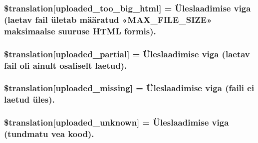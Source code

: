 \subsubsection[{\$translation}]{\setlength{\rightskip}{0pt plus 5cm}\$translation\mbox{[}\textquotesingle{}uploaded\+\_\+too\+\_\+big\+\_\+html\textquotesingle{}\mbox{]} = \textquotesingle{}Üleslaadimise viga (laetav fail ületab määratud «\+M\+A\+X\+\_\+\+F\+I\+L\+E\+\_\+\+S\+I\+Z\+E» maksimaalse suuruse H\+T\+M\+L formis).\textquotesingle{}}\label{class_8upload_8et___e_e_8php_a623d5b8b92169f57d7e43458aa911cbb}
\hypertarget{class_8upload_8et___e_e_8php_a967c17da21b0a2d3bd65cca3a9ca0ea8}{}
\subsubsection[{\$translation}]{\setlength{\rightskip}{0pt plus 5cm}\$translation\mbox{[}\textquotesingle{}uploaded\+\_\+partial\textquotesingle{}\mbox{]} = \textquotesingle{}Üleslaadimise viga (laetav fail oli ainult osaliselt laetud).\textquotesingle{}}\label{class_8upload_8et___e_e_8php_a967c17da21b0a2d3bd65cca3a9ca0ea8}
\hypertarget{class_8upload_8et___e_e_8php_a0cce433260be65f1f35853a6b4b8952b}{}
\subsubsection[{\$translation}]{\setlength{\rightskip}{0pt plus 5cm}\$translation\mbox{[}\textquotesingle{}uploaded\+\_\+missing\textquotesingle{}\mbox{]} = \textquotesingle{}Üleslaadimise viga (faili ei laetud üles).\textquotesingle{}}\label{class_8upload_8et___e_e_8php_a0cce433260be65f1f35853a6b4b8952b}
\hypertarget{class_8upload_8et___e_e_8php_a4a9168e922b827e6a28b5db1c00774ca}{}
\subsubsection[{\$translation}]{\setlength{\rightskip}{0pt plus 5cm}\$translation\mbox{[}\textquotesingle{}uploaded\+\_\+unknown\textquotesingle{}\mbox{]} = \textquotesingle{}Üleslaadimise viga (tundmatu vea kood).\textquotesingle{}}\label{class_8upload_8et___e_e_8php_a4a9168e922b827e6a28b5db1c00774ca}
\hypertarget{class_8upload_8et___e_e_8php_a3afc377bd803683314f413a814243066}{}
